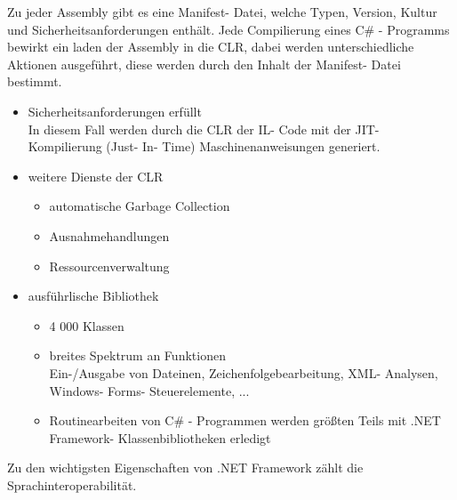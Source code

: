 \documentclass[12pt,a4paper]{report}
\begin{document}
\begin{onehalfspace}
Zu jeder Assembly gibt es eine Manifest- Datei, welche Typen, Version, Kultur und Sicherheitsanforderungen enthält. Jede Compilierung eines C\# - Programms bewirkt ein laden der Assembly in die CLR, dabei werden unterschiedliche Aktionen ausgeführt, diese werden durch den Inhalt der Manifest- Datei bestimmt. \\
\begin{itemize}
\item Sicherheitsanforderungen erfüllt\\
In diesem Fall werden durch die CLR der IL- Code mit der JIT- Kompilierung (Just- In- Time) Maschinenanweisungen generiert.
\item weitere Dienste der CLR
\begin{itemize}
\item automatische Garbage Collection
\item Ausnahmehandlungen
\item Ressourcenverwaltung
\end{itemize}
\item ausführlische Bibliothek
\begin{itemize}
\item 4 000 Klassen
\item breites Spektrum an Funktionen\\
Ein-/Ausgabe von Dateinen, Zeichenfolgebearbeitung, XML- Analysen, Windows- Forms- Steuerelemente, ...
\item Routinearbeiten von C\# - Programmen werden größten Teils mit .NET Framework- Klassenbibliotheken erledigt
\end{itemize}
\end{itemize}
Zu den wichtigsten Eigenschaften von .NET Framework zählt die Sprachinteroperabilität.\\


\end{onehalfspace}
\end{document}
